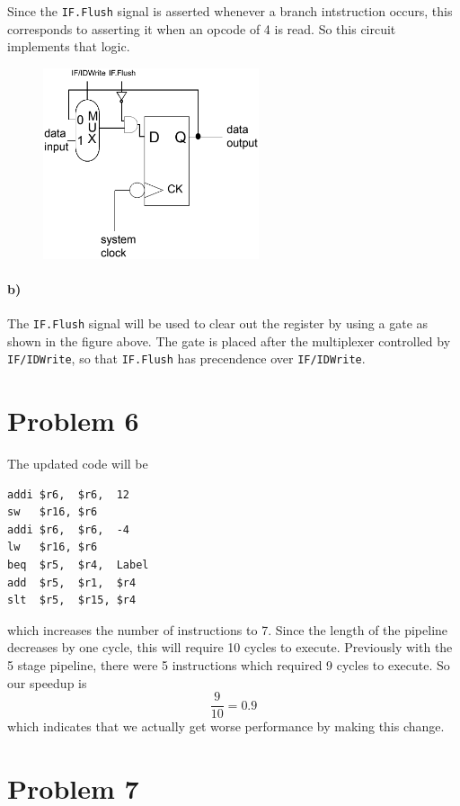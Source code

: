 \documentclass[12pt]{article}
\begin{document}
Since the \texttt{IF.Flush} signal is asserted whenever a branch intstruction occurs, this corresponds to asserting it when an opcode of 4 is read. So this
circuit implements that logic.

\begin{figure}[!ht]
        \begin{center}
                \includegraphics[width=2.5in]{problem5b.png}
        \end{center}
\end{figure}

\paragraph{b)}

The \texttt{IF.Flush} signal will be used to clear out the register by using a gate as shown in the figure above. The gate is placed after the
multiplexer controlled by \texttt{IF/IDWrite}, so that \texttt{IF.Flush} has precendence over \texttt{IF/IDWrite}.

\section*{Problem 6}

The updated code will be
\begin{verbatim}
addi $r6,  $r6,  12
sw   $r16, $r6
addi $r6,  $r6,  -4
lw   $r16, $r6
beq  $r5,  $r4,  Label
add  $r5,  $r1,  $r4
slt  $r5,  $r15, $r4
\end{verbatim}
which increases the number of instructions to 7. Since the length of the pipeline decreases by one cycle, this will require 10 cycles to execute.
Previously with the 5 stage pipeline, there were 5 instructions which required 9 cycles to execute. So our speedup is
\[\frac{9}{10}=0.9\]
which indicates that we actually get worse performance by making this change.

\section*{Problem 7}
\end{document}
